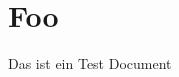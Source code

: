 \documentclass{article}
\begin{document}
    \section{Foo}
    Das ist ein Test Document
\end{document}
